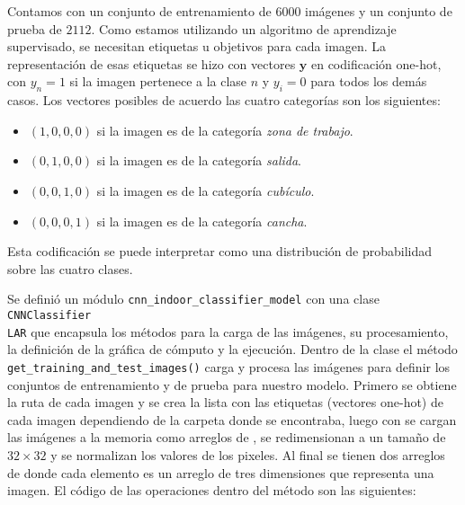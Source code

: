 Contamos con un conjunto de entrenamiento de $6000$ imágenes y 
un conjunto de prueba de $2112$.
Como estamos utilizando un algoritmo de aprendizaje supervisado, 
se necesitan etiquetas u objetivos para cada imagen. La representación
de esas etiquetas se hizo con vectores $\mathbf{y}$ en codificación one-hot,
con $y_n = 1$ si la imagen pertenece a la clase $n$ y $y_i = 0$ para todos los
demás casos. Los vectores posibles de acuerdo las cuatro categorías son los siguientes:

\begin{itemize}
\item $(1, 0, 0, 0)$ si la imagen es de la categoría \textit{zona de trabajo}.
\item $(0, 1, 0, 0)$ si la imagen es de la categoría \textit{salida}.
\item $(0, 0, 1, 0)$ si la imagen es de la categoría \textit{cubículo}.
\item $(0, 0, 0, 1)$ si la imagen es de la categoría \textit{cancha}.
\end{itemize}

Esta codificación se puede interpretar como una distribución de probabilidad
sobre las cuatro clases.

Se definió un módulo \texttt{cnn\_indoor\_classifier\_model} con 
una clase \texttt{CNNClassifier\\LAR}
que encapsula los métodos para la carga de las imágenes, su 
procesamiento, la definición de la gráfica de cómputo y la ejecución.
Dentro de la clase el método \texttt{get\_training\_and\_test\_images()}
carga y procesa las imágenes para definir los conjuntos de entrenamiento
y de prueba para nuestro modelo.
Primero se obtiene la ruta de cada imagen y se crea la lista con las etiquetas
(vectores one-hot)
de cada imagen dependiendo de la carpeta donde se encontraba, luego con
 se cargan las imágenes a la memoria como arreglos de
, se redimensionan a un tamaño de $32 \times 32$ y se normalizan
los valores de los pixeles. Al final se tienen dos arreglos de 
donde cada elemento es un arreglo de tres dimensiones que
representa una imagen. El código de las operaciones dentro del método
son las siguientes:

